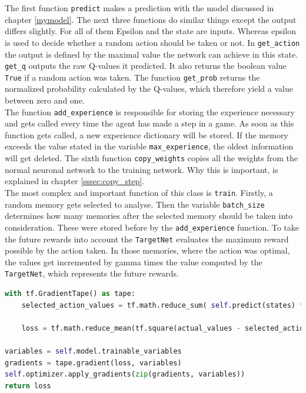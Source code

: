 \documentclass[12pt]{article}
\begin{document}
The first function \lstinline{predict} makes a prediction with the model discussed in chapter \ref{mymodel}. The next three functions do similar things except the \gls{output} differs slightly. For all of them  Epsilon and the \gls{state} are  \glspl{input}. Whereas epsilon is used to decide whether a random action should be taken or not. In \lstinline{get_action} the \gls{output} is defined by the maximal value the network can achieve in this \gls{state}.  \lstinline{get_q} \glspl{output} the raw \glspl{Q-value} it predicted. It also returns the boolean value \lstinline{True} if a random action was taken. The function \lstinline{get_prob}  returns the normalized probability calculated by the \glspl{Q-value}, which therefore yield a value between zero and one. \\ The function \lstinline{add_experience} is responsible for storing the \gls{experience} necessary and gets called every time the agent has made a step in a game. As soon as this function gets called, a new \gls{experience} dictionary will be stored. If the \gls{memory} exceeds the value stated in the variable \lstinline{max_experience}, the oldest information will get deleted. The sixth function \lstinline{copy_weights} copies all the \glspl{weight} from the normal \gls{neuronal network} to the training network. Why this is important, is explained in chapter \ref{sssec:copy_step}.\\
The most complex and important function of this class is \lstinline{train}. Firstly, a random \gls{memory} gets selected to analyse. Then the variable \lstinline{batch_size} determines how many memories after the selected \gls{memory} should be taken into consideration. These were stored before by the \lstinline{add_experience} function. To take the future \glspl{reward} into account the \lstinline{TargetNet} evaluates the maximum \gls{reward} possible by the action taken. In those memories, where the action was optimal, the values get incremented by \gls{gamma} times the value computed by the \lstinline{TargetNet}, which represents the future \glspl{reward}. 
\begin{lstlisting}[language=Python, caption = Example - Optimization of the network]
with tf.GradientTape() as tape:
    selected_action_values = tf.math.reduce_sum( self.predict(states) * tf.one_hot(actions, self.num_actions), axis=1) 

    loss = tf.math.reduce_mean(tf.square(actual_values - selected_action_values)) 
    
variables = self.model.trainable_variables
gradients = tape.gradient(loss, variables)
self.optimizer.apply_gradients(zip(gradients, variables)) 
return loss
\end{lstlisting}
\end{document}
